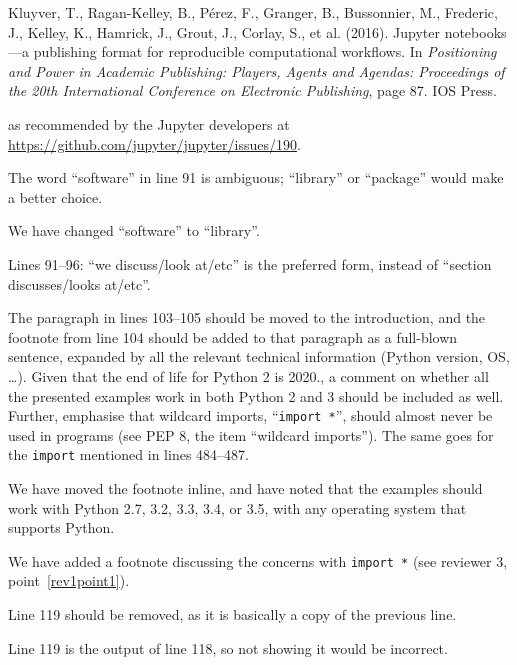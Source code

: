 \documentclass[answers,12pt]{exam}
\begin{document}
\begin{questions}
\begin{solution}
Kluyver, T., Ragan-Kelley, B., P{\'e}rez, F.,
Granger, B., Bussonnier, M., Frederic, J., Kelley,
K., Hamrick, J., Grout,
J., Corlay, S., et al. (2016). Jupyter notebooks---a publishing format for
reproducible computational workflows. In \textit{Positioning and Power in Academic
Publishing: Players, Agents and Agendas: Proceedings of the 20th International
Conference on Electronic Publishing}, page 87. IOS Press.

as recommended by the Jupyter developers at \url{https://github.com/jupyter/jupyter/issues/190}.
\end{solution}

\question The word ``software'' in line 91 is ambiguous; ``library'' or ``package'' would make a better choice.
\begin{solution}
We have changed ``software'' to ``library''.
\end{solution}

\question Lines 91--96: ``we discuss/look at/etc'' is the preferred form, instead of ``section discusses/looks at/etc''.
\begin{solution}
\end{solution}

\question The paragraph in lines 103--105 should be moved to the introduction,
and the footnote from line 104 should be added to that paragraph as a
full-blown sentence, expanded by all the relevant technical information
(Python version, OS, \ldots). Given that the end of life for Python 2 is
2020., a comment on whether all the presented examples work in both Python 2
and 3 should be included as well. Further, emphasise that wildcard imports,
``\texttt{import *}'', should almost never be used in programs (see PEP 8, the
item ``wildcard imports''). The same goes for the \texttt{import} mentioned in lines 484--487.
\begin{solution}
We have moved the footnote inline, and have noted that the examples should
work with Python 2.7, 3.2, 3.3, 3.4, or 3.5, with any operating system that
supports Python.

We have added a footnote discussing the concerns with \texttt{import *} (see
reviewer 3, point~\ref{rev1point1}).
\end{solution}

\question Line 119 should be removed, as it is basically a copy of the previous line.
\begin{solution}
Line 119 is the output of line 118, so not showing it would
be incorrect.


\end{solution}
\end{questions}
\end{document}

